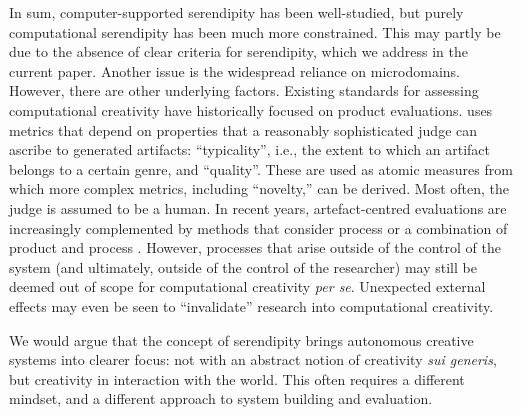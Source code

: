In sum, computer-supported serendipity has been well-studied, but
purely computational serendipity has been much more constrained.
This may partly be
due to the absence of clear criteria for serendipity, which we address
in the current paper.  Another issue is the widespread reliance on microdomains.  However, there are other underlying factors.
Existing standards for assessing computational creativity have
historically focused on product evaluations.
 uses metrics that depend on properties that a reasonably sophisticated judge can ascribe to generated artifacts:  ``typicality'', i.e., the extent to which an artifact belongs to a certain genre, and ``quality''.  These are used as atomic measures from which more complex metrics, including ``novelty,'' can be derived.  Most often, the judge is assumed to be a human.
%
In recent years, artefact-centred evaluations are increasingly
complemented by methods that consider process
\cite{colton2008creativity} or a combination of product and process
\cite{jordanous:12,colton-assessingprogress}.  However, processes that
arise outside of the control of the system (and ultimately, outside of
the control of the researcher) may still be deemed out of scope for
computational creativity \emph{per se}.  Unexpected external effects
may even be seen to ``invalidate'' research into computational
creativity.

We would argue that the concept of serendipity brings autonomous
creative systems into clearer focus: not with an abstract notion of
creativity \emph{sui generis}, but creativity in
interaction with the world.  This often requires a different mindset,
and a different approach to system building and evaluation.


